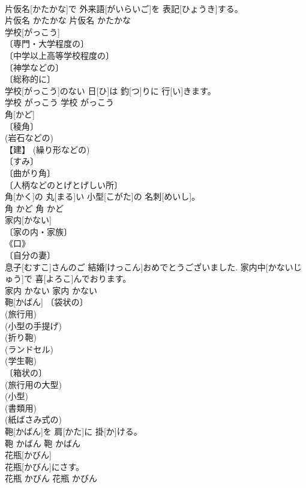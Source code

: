 \documentclass[8pt]{extreport}
\begin{document}
\begin{CJK}{UTF8}{min}
\\	片仮名[かたかな]で 外来語[がいらいご]を 表記[ひょうき]する。	
\\	片仮名	かたかな	片仮名	かたかな	
\\	学校[がっこう]	
\\	〔専門・大学程度の〕 
\\	〔中学以上高等学校程度の〕 
\\	〔神学などの〕 
\\	〔総称的に〕 
\\	学校[がっこう]のない 日[ひ]は 釣[つ]りに 行[い]きます。	
\\	学校	がっこう	学校	がっこう	
\\	角[かど]	
\\	〔稜角〕 
\\	(岩石などの) 
\\	【建】 (繰り形などの) 
\\	〔すみ〕 
\\	〔曲がり角〕 
\\	〔人柄などのとげとげしい所〕 
\\	角[かく]の 丸[まる]い 小型[こがた]の 名刺[めいし]。	
\\	角	かど	角	かど	
\\	家内[かない]	
\\	〔家の内・家族〕 
\\	《口》 
\\	〔自分の妻〕 
\\	息子[むすこ]さんのご 結婚[けっこん]おめでとうございました. 家内中[かないじゅう]で 喜[よろこ]んでおります。	
\\	家内	かない	家内	かない	
\\	鞄[かばん]	〔袋状の〕 
\\	(旅行用) 
\\	(小型の手提げ) 
\\	(折り鞄) 
\\	(ランドセル) 
\\	(学生鞄) 
\\	〔箱状の〕 
\\	(旅行用の大型) 
\\	(小型) 
\\	(書類用) 
\\	(紙ばさみ式の) 
\\	鞄[かばん]を 肩[かた]に 掛[か]ける。	
\\	鞄	かばん	鞄	かばん	
\\	花瓶[かびん]	
\\	花瓶[かびん]にさす。	
\\	花瓶	かびん	花瓶	かびん	

\end{CJK}
\end{document}
